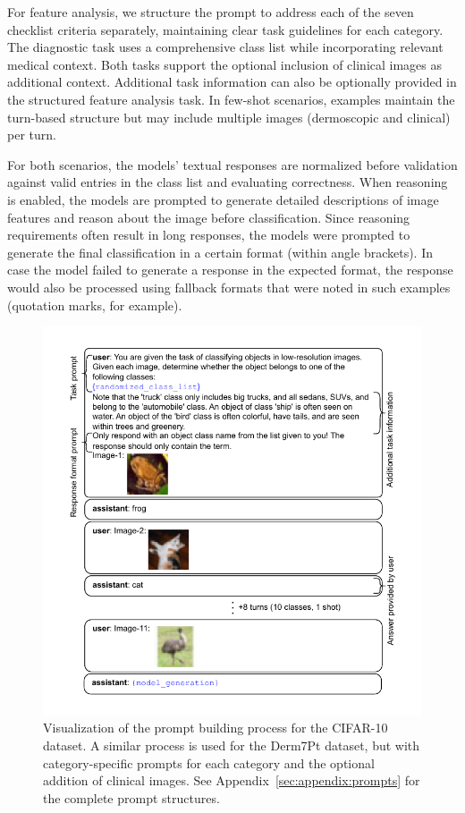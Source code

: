 \documentclass[../ShajiS_RnDReport.tex]{subfiles}
\begin{document}
For feature analysis, we structure the prompt to address each of the seven checklist criteria separately, maintaining clear task guidelines for each category. The diagnostic task uses a comprehensive class list while incorporating relevant medical context. Both tasks support the optional inclusion of clinical images as additional context. Additional task information can also be optionally provided in the structured feature analysis task. In few-shot scenarios, examples maintain the turn-based structure but may include multiple images (dermoscopic and clinical) per turn. 

For both scenarios, the models' textual responses are normalized before validation against valid entries in the class list and evaluating correctness. When reasoning is enabled, the models are prompted to generate detailed descriptions of image features and reason about the image before classification. Since reasoning requirements often result in long responses, the models were prompted to generate the final classification in a certain format (within angle brackets). In case the model failed to generate a response in the expected format, the response would also be processed using fallback formats that were noted in such examples (quotation marks, for example).

\begin{figure}[ht]
    \centering
    \includegraphics[width=\linewidth]{figures/prompt_building.pdf}
    \caption{Visualization of the prompt building process for the CIFAR-10 dataset. A similar process is used for the Derm7Pt dataset, but with category-specific prompts for each category and the optional addition of clinical images. See Appendix~\ref{sec:appendix:prompts} for the complete prompt structures.}
    \label{fig:prompt-building}
\end{figure}
\end{document}
